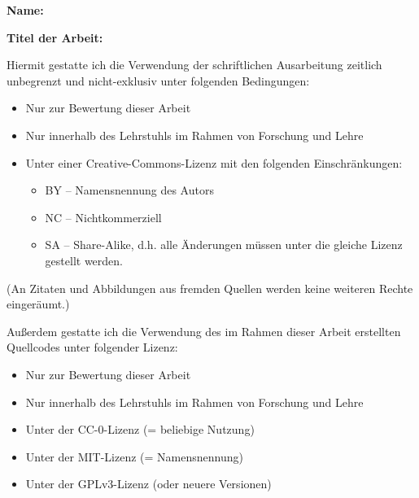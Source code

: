 
\noindent
\textbf{Name:} \getAuthor
\medskip

\noindent
\textbf{Titel der Arbeit:} \textit{\getTitle}
\medskip

\begin{spacing}{1.15}
\noindent
Hiermit gestatte ich die Verwendung der schriftlichen Ausarbeitung zeitlich unbegrenzt und nicht-exklusiv unter folgenden Bedingungen:

\bigskip
\noindent
\begin{spacing}{1}
\begin{itemize}
    \item[]{\checkboxEmpty Nur zur Bewertung dieser Arbeit}
    \item[]{\checkboxEmpty Nur innerhalb des Lehrstuhls im Rahmen von Forschung und Lehre}
    \item[]{\checkboxChecked Unter einer Creative-Commons-Lizenz mit den folgenden Einschränkungen:}
    \begin{itemize}
        \item[]{\checkboxChecked BY – Namensnennung des Autors}
        \item[]{\checkboxEmpty NC – Nichtkommerziell}
        \item[]{\checkboxEmpty SA – Share-Alike, d.h. alle Änderungen müssen unter die gleiche Lizenz gestellt werden.}
    \end{itemize}
\end{itemize}
\end{spacing}

\bigskip
\noindent
{\scriptsize(An Zitaten und Abbildungen aus fremden Quellen werden keine weiteren Rechte eingeräumt.)}

\bigskip
\noindent
Außerdem gestatte ich die Verwendung des im Rahmen dieser Arbeit erstellten Quellcodes unter folgender Lizenz:

\begin{spacing}{1}
\begin{itemize}
    \item[]{\checkboxEmpty Nur zur Bewertung dieser Arbeit}
    \item[]{\checkboxEmpty Nur innerhalb des Lehrstuhls im Rahmen von Forschung und Lehre}
    \item[]{\checkboxEmpty Unter der CC-0-Lizenz (= beliebige Nutzung)}
    \item[]{\checkboxChecked Unter der MIT-Lizenz (= Namensnennung)}
    \item[]{\checkboxEmpty Unter der GPLv3-Lizenz (oder neuere Versionen)}
\end{itemize}
\end{spacing}


\end{spacing}
